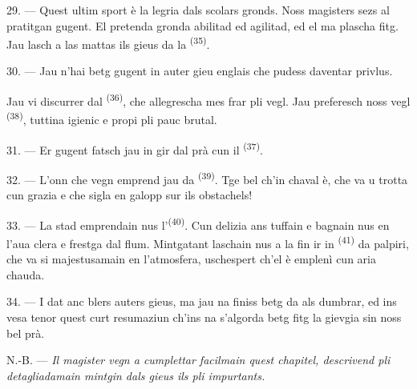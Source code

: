 29. --- Quest ultim sport è la legria dals scolars gronds. Noss magisters sezs al
pratitgan gugent. El pretenda gronda abilitad ed agilitad, ed el ma plascha fitg.
Jau lasch a las mattas ils gieus da la \textsuperscript{(35)}.

30. --- Jau n'hai betg gugent in auter gieu englais che pudess daventar privlus.

Jau vi discurrer dal \textsuperscript{(36)}, che allegrescha mes
frar pli vegl. Jau preferesch noss vegl \textsuperscript{(38)}, tuttina igienic e propi pli pauc brutal.

\VUsaut{4.6mm}
\VUsaut{3.0mm}

31. --- Er gugent fatsch jau in gir dal prà cun il \textsuperscript{(37)}.

32. --- L'onn che vegn emprend jau da \textsuperscript{(39)}.
Tge bel ch'in chaval è, che va u trotta cun grazia e che sigla en galopp sur ils
obstachels!

33. --- La stad emprendain nus l'\textsuperscript{(40)}. Cun
delizia ans tuffain e bagnain nus en l'aua clera e frestga dal flum. Mintgatant
laschain nus a la fin ir in \textsuperscript{(41)} da palpiri, che
va si majestusamain en l'atmosfera, uschespert ch'el è emplenì cun aria chauda.

34. --- I dat anc blers auters gieus, ma jau na finiss betg da als dumbrar, ed
ins vesa tenor quest curt resumaziun ch'ins na s'algorda betg fitg la gievgia sin
noss bel prà.

N.-B. --- \textit{Il magister vegn a cumplettar facilmain quest chapitel,
descrivend pli detagliadamain mintgin dals gieus ils pli impurtants.}
\VUsaut{6.0mm}
\VUfilet{22mm}
